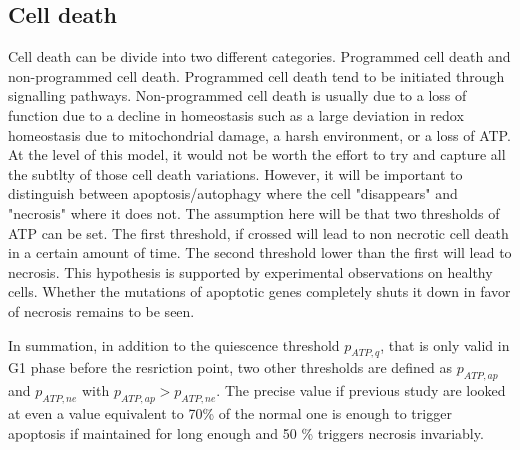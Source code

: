 \documentclass[11pt,a4paper]{article}
\begin{document}
\subsection{Cell death}
Cell death can be divide into  two different categories. Programmed cell death and non-programmed cell death. Programmed cell death tend to be initiated through signalling pathways. Non-programmed cell death is usually due to a loss of function due to a decline in homeostasis such as a large deviation in redox homeostasis due to mitochondrial damage, a harsh environment, or a loss of ATP. At the level of this model, it would not be worth the effort to try and capture all the subtlty of those cell death variations. However, it will be important to distinguish between apoptosis/autophagy where the cell "disappears" and "necrosis" where it does not. The assumption here will be that two thresholds of ATP can be set. The first threshold, if crossed will lead to non necrotic cell death in a certain amount of time. The second threshold lower than the first will lead to necrosis. This  hypothesis is supported by experimental observations on healthy cells. \cite{Lieberthal1998}\cite{Why1999} \cite{Yee2021} Whether the mutations of apoptotic genes completely shuts it down in favor of necrosis remains to be seen.

In summation, in addition to the quiescence threshold $p_{ATP,q}$, that is only valid in G1 phase before the resriction point, two  other thresholds are defined as $p_{ATP,ap}$ and $p_{ATP,ne}$ with  $p_{ATP,ap} > p_{ATP,ne}$. The precise value if previous study are looked at even a value equivalent to 70\% of the normal one is enough to trigger apoptosis if maintained for long enough and 50 \% triggers necrosis invariably.\cite{Lieberthal1998}
\end{document}
